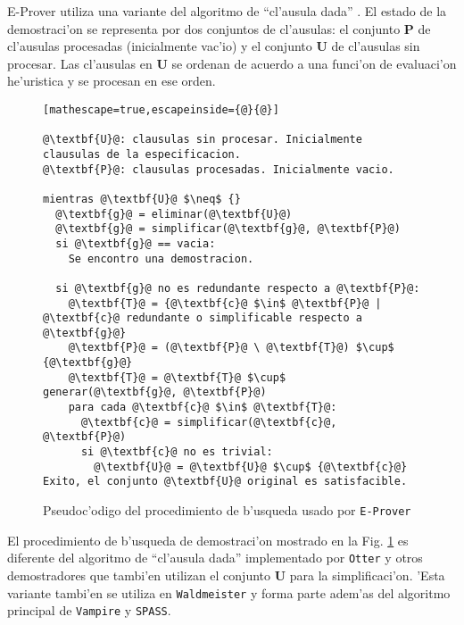 E-Prover utiliza una variante del algoritmo de ``cl'ausula dada'' \cite{dk97}. El estado de la demostraci'on se representa por dos conjuntos de cl'ausulas: el conjunto \textbf{P} de cl'ausulas procesadas (inicialmente vac'io) y el conjunto \textbf{U} de cl'ausulas sin procesar. Las cl'ausulas en \textbf{U} se ordenan de acuerdo a una funci'on de evaluaci'on he'uristica y se procesan en ese orden.



\begin{figure}
\begin{lstlisting}[mathescape=true,escapeinside={@}{@}]

@\textbf{U}@: clausulas sin procesar. Inicialmente clausulas de la especificacion.
@\textbf{P}@: clausulas procesadas. Inicialmente vacio.

mientras @\textbf{U}@ $\neq$ {}
  @\textbf{g}@ = eliminar(@\textbf{U}@)
  @\textbf{g}@ = simplificar(@\textbf{g}@, @\textbf{P}@)
  si @\textbf{g}@ == vacia:
    Se encontro una demostracion.
  
  si @\textbf{g}@ no es redundante respecto a @\textbf{P}@:
    @\textbf{T}@ = {@\textbf{c}@ $\in$ @\textbf{P}@ | @\textbf{c}@ redundante o simplificable respecto a @\textbf{g}@}
    @\textbf{P}@ = (@\textbf{P}@ \ @\textbf{T}@) $\cup$ {@\textbf{g}@}
    @\textbf{T}@ = @\textbf{T}@ $\cup$ generar(@\textbf{g}@, @\textbf{P}@)
    para cada @\textbf{c}@ $\in$ @\textbf{T}@:
      @\textbf{c}@ = simplificar(@\textbf{c}@, @\textbf{P}@)
      si @\textbf{c}@ no es trivial:
        @\textbf{U}@ = @\textbf{U}@ $\cup$ {@\textbf{c}@}
Exito, el conjunto @\textbf{U}@ original es satisfacible.

\end{lstlisting}
\caption{Pseudoc'odigo del procedimiento de b'usqueda usado por \texttt{E-Prover}}
\label{fig:codigo_clausula_dada_eprover}
\end{figure}

El procedimiento de b'usqueda de demostraci'on mostrado en la Fig. \ref{fig:codigo_clausula_dada_eprover} es diferente del algoritmo de ``cl'ausula dada'' implementado por \texttt{Otter}\cite{otter} y otros demostradores que tambi'en utilizan el conjunto \textbf{U} para la simplificaci'on. 'Esta variante tambi'en se utiliza en \texttt{Waldmeister}\cite{BH96} y forma parte adem'as del algoritmo principal de \texttt{Vampire} \cite{vampire} y \texttt{SPASS}\cite{spass}.

